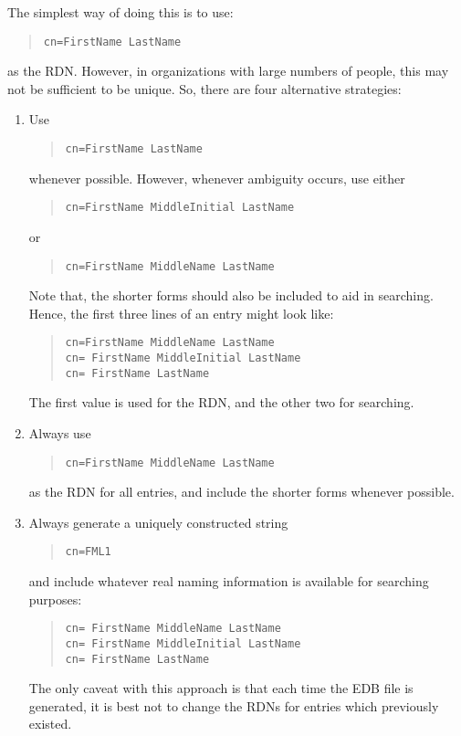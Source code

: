 The simplest way of doing this is to use:
\begin{quote}\small\begin{verbatim}
cn=FirstName LastName
\end{verbatim}\end{quote}
as the RDN.
However,
in organizations with large numbers of people,
this may not be sufficient to be unique.
So, there are four alternative strategies:
\begin{enumerate}
\item	Use
\begin{quote}\small\begin{verbatim}
cn=FirstName LastName
\end{verbatim}\end{quote}
	whenever possible.
	However,
	whenever ambiguity occurs, use either
\begin{quote}\small\begin{verbatim}
cn=FirstName MiddleInitial LastName
\end{verbatim}\end{quote}
	or
\begin{quote}\small\begin{verbatim}
cn=FirstName MiddleName LastName
\end{verbatim}\end{quote}
	Note that,
	the shorter forms should also be included to aid in searching.
	Hence,
	the first three lines of an entry might look like:
\begin{quote}\small\begin{verbatim}
cn=FirstName MiddleName LastName
cn= FirstName MiddleInitial LastName
cn= FirstName LastName
\end{verbatim}\end{quote}
	The first value is used for the RDN,
	and the other two for searching.

\item	Always use
\begin{quote}\small\begin{verbatim}
cn=FirstName MiddleName LastName
\end{verbatim}\end{quote}
	as the RDN for all entries,
	and include the shorter forms whenever possible.

\item	Always generate a uniquely constructed string
\begin{quote}\small\begin{verbatim}
cn=FML1
\end{verbatim}\end{quote}
and include whatever real naming information is available for searching
purposes:
\begin{quote}\small\begin{verbatim}
cn= FirstName MiddleName LastName
cn= FirstName MiddleInitial LastName
cn= FirstName LastName
\end{verbatim}\end{quote}
The only caveat with this approach is that each time the EDB file is
generated, it is best not to change the RDNs for entries which previously
existed.


\end{enumerate}
